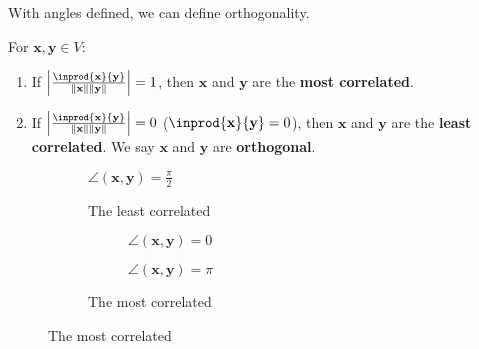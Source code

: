 \documentclass{huhtakm-template-book-v2}
\begin{document}
    With angles defined, we can define orthogonality.
    \begin{defn}
        For $\mathbf{x}, \mathbf{y} \in V$:
        \begin{enumerate}
            \item If $\abs{\frac{\inprod{\mathbf{x}}{\mathbf{y}}}{\norm{\mathbf{x}}\norm{\mathbf{y}}}} = 1$, then $\mathbf{x}$ and $\mathbf{y}$ are the \textbf{most correlated}.
            \item If $\abs{\frac{\inprod{\mathbf{x}}{\mathbf{y}}}{\norm{\mathbf{x}}\norm{\mathbf{y}}}} = 0$ ($\inprod{\mathbf{x}}{\mathbf{y}} = 0$), then $\mathbf{x}$ and $\mathbf{y}$ are the \textbf{least correlated}. We say $\mathbf{x}$ and $\mathbf{y}$ are \textbf{orthogonal}.
        \end{enumerate}
    \end{defn}
    \begin{figure}[h]
        \centering
        \begin{subfigure}{0.3\textwidth}
            \centering
            
            $\angle(\mathbf{x}, \mathbf{y}) = \frac{\pi}{2}$
            \caption{The least correlated}
        \end{subfigure}
        \begin{subfigure}{0.6\textwidth}
            \centering
            \begin{subfigure}{0.4\textwidth}
                \centering
                
                $\angle(\mathbf{x}, \mathbf{y}) = 0$
            \end{subfigure}
            \begin{subfigure}{0.4\textwidth}
                \centering
                
                $\angle(\mathbf{x}, \mathbf{y}) = \pi$
            \end{subfigure}
            \caption{The most correlated}
        \end{subfigure}
    \end{figure}
\end{document}
